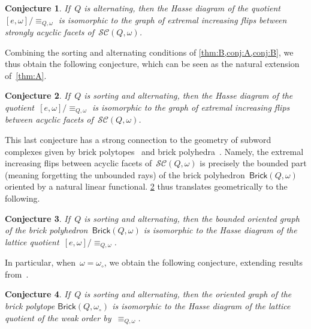 \documentclass[reqno]{amsart}
\newtheorem{conjectureA}{Conjecture}
\theoremstyle{definition}
\newcommand{\wo}{\omega_\circ} %
\newcommand{\subwordComplex}{\mathcal{SC}} %
\newcommand{\brickPolyhedron}{\mathsf{Brick}} %
\begin{document}
\begin{conjectureA}
\label{conj:B}
If~$Q$ is alternating, then the Hasse diagram of the quotient~$[e, \omega]/\equiv_{Q, \omega}$ is isomorphic to the graph of extremal increasing flips between strongly acyclic facets of~$\subwordComplex(Q, \omega)$.
\end{conjectureA}

Combining the sorting and alternating conditions of \cref{thm:B,conj:A,conj:B}, we thus obtain the following conjecture, which can be seen as the natural extension of~\cref{thm:A}.

\begin{conjectureA}
\label{conj:C}
If~$Q$ is sorting and alternating, then the Hasse diagram of the quotient~$[e, \omega]/\equiv_{Q, \omega}$ is isomorphic to the graph of extremal increasing flips between acyclic facets of~$\subwordComplex(Q, \omega)$.
\end{conjectureA}

This last conjecture has a strong connection to the geometry of subword complexes given by brick polytopes~\cite{PilaudSantos-brickPolytope, PilaudStump-brickPolytope} and brick polyhedra~\cite{JahnStump}.
Namely, the extremal increasing flips between acyclic facets of~$\subwordComplex(Q, \omega)$ is precisely the bounded part (meaning forgetting the unbounded rays) of the brick polyhedron~$\brickPolyhedron(Q, \omega)$ oriented by a natural linear functional.
\cref{conj:C} thus translates geometrically to the following.

\begin{conjectureA}
\label{conj:D}
If~$Q$ is sorting and alternating, then the bounded oriented graph of the brick polyhedron~$\brickPolyhedron(Q, \omega)$ is isomorphic to the Hasse diagram of the lattice quotient~$[e, \omega]/\equiv_{Q, \omega}$.
\end{conjectureA}

In particular, when~$\omega = \wo$, we obtain the following conjecture, extending results from~\cite{Pilaud-brickAlgebra}.

\begin{conjectureA}
\label{conj:E}
If~$Q$ is sorting and alternating, then the oriented graph of the brick polytope $\brickPolyhedron(Q, \wo)$ is isomorphic to the Hasse diagram of the lattice quotient of the weak order by~$\equiv_{Q, \omega}$.
\end{conjectureA}

\end{document}
